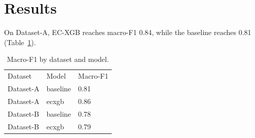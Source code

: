 \section{Results}
On Dataset-A, EC-XGB reaches macro-F1 0.84, while the baseline reaches 0.81 (Table~\ref{tab:main}).

\begin{table}[t]
\caption{Macro-F1 by dataset and model.}
\label{tab:main}
\begin{tabular}{lll}
Dataset & Model & Macro-F1 \\
Dataset-A & baseline & 0.81 \\
Dataset-A & ecxgb & 0.86 \\
Dataset-B & baseline & 0.78 \\
Dataset-B & ecxgb & 0.79 \\
\end{tabular}
\end{table}
